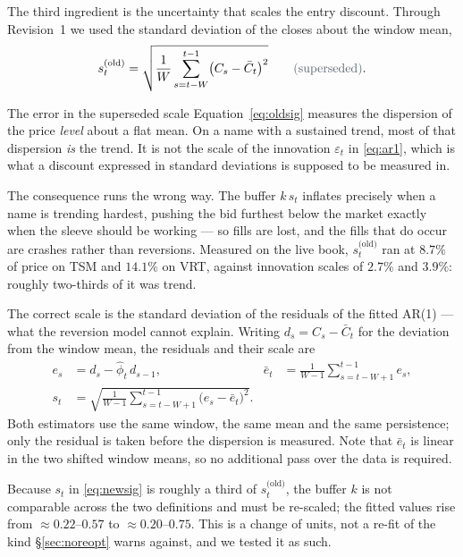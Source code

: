 \documentclass[11pt]{article}
\begin{document}
The third ingredient is the uncertainty that scales the entry discount. Through Revision~1 we
used the standard deviation of the closes about the window mean,
\begin{equation}\label{eq:oldsig}
s_t^{\text{(old)}}=\sqrt{\frac1W\sum_{s=t-W}^{t-1}\bigl(C_s-\bar C_t\bigr)^2 }
\qquad\text{\color{bcgrey}(superseded)} .
\end{equation}

\begin{fixbox}{The error in the superseded scale}
Equation~\eqref{eq:oldsig} measures the dispersion of the price \emph{level} about a flat mean.
On a name with a sustained trend, most of that dispersion \emph{is} the trend. It is not the
scale of the innovation $\varepsilon_t$ in \eqref{eq:ar1}, which is what a discount expressed in
standard deviations is supposed to be measured in.

The consequence runs the wrong way. The buffer $k\,s_t$ inflates precisely when a name is
trending hardest, pushing the bid furthest below the market exactly when the sleeve should be
working --- so fills are lost, and the fills that do occur are crashes rather than reversions.
Measured on the live book, $s_t^{\text{(old)}}$ ran at $8.7\%$ of price on TSM and $14.1\%$ on
VRT, against innovation scales of $2.7\%$ and $3.9\%$: roughly two-thirds of it was trend.
\end{fixbox}

The correct scale is the standard deviation of the residuals of the fitted AR(1) --- what the
reversion model cannot explain. Writing $d_s=C_s-\bar C_t$ for the deviation from the window
mean, the residuals and their scale are
\begin{align}
e_s &= d_s-\hat\phi_t\,d_{s-1}, &
\bar e_t &= \frac{1}{W-1}\sum_{s=t-W+1}^{t-1} e_s, \\
s_t &= \sqrt{\frac{1}{W-1}\sum_{s=t-W+1}^{t-1}\bigl(e_s-\bar e_t\bigr)^2}. \label{eq:newsig}
\end{align}
Both estimators use the same window, the same mean and the same persistence; only the residual
is taken before the dispersion is measured. Note that $\bar e_t$ is linear in the two shifted
window means, so no additional pass over the data is required.

Because $s_t$ in \eqref{eq:newsig} is roughly a third of $s_t^{\text{(old)}}$, the buffer $k$ is
not comparable across the two definitions and must be re-scaled; the fitted values rise from
$\approx0.22$--$0.57$ to $\approx0.20$--$0.75$. This is a change of units, not a re-fit of the
kind \S\ref{sec:noreopt} warns against, and we tested it as such.
\end{document}
